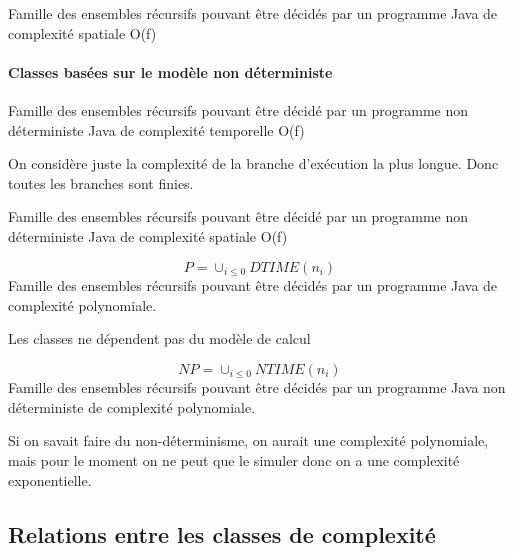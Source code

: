 \begin{mydef}[DSPACE(f)]
	Famille des ensembles récursifs pouvant être décidés par un programme 
	Java de complexité spatiale O(f)
\end{mydef}

\paragraph{Classes basées sur le modèle non déterministe}
\begin{mydef}[NDTIME(f)]
	Famille des ensembles récursifs pouvant être décidé par un programme 
	non déterministe Java de complexité temporelle O(f)
\end{mydef}

\begin{myrem}
	On considère juste la complexité de la branche d'exécution la plus
	longue. Donc toutes les branches sont finies.	
\end{myrem}

\begin{mydef}[NDSPACE(f)]
	Famille des ensembles récursifs pouvant être décidé par un programme 
	non déterministe Java de complexité spatiale O(f)
\end{mydef}

\begin{mydef}[Classe P]
	\[ P = \cup _{i \leq 0} DTIME(n_i)\]
	Famille des ensembles récursifs pouvant être décidés par un programme
	Java de complexité polynomiale.
\end{mydef}

\begin{myrem}
	Les classes ne dépendent pas du modèle de calcul
\end{myrem}

\begin{mydef}[Classe NP]
	\[ NP = \cup _{i \leq 0} NTIME(n_i)\]
	Famille des ensembles récursifs pouvant être décidés par un programme
	Java non déterministe de complexité polynomiale.
\end{mydef}

\begin{myrem}
	Si on savait faire du non-déterminisme, on aurait une complexité polynomiale,
	mais pour le moment on ne peut que le simuler donc on a une complexité
	exponentielle.
\end{myrem}

\subsection{Relations entre les classes de complexité}
\label{sub:relations_entre_les_classes_de_complexit_}

